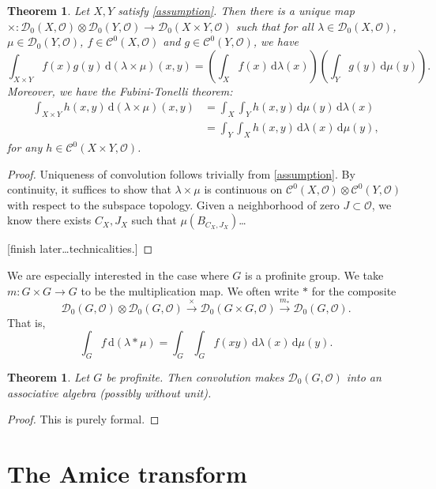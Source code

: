 \documentclass{article}
\newcommand{\cO}{\mathcal{O}}
\newcommand{\dd}{\mathrm{d}}
\newcommand{\sC}{\mathscr{C}}
\newcommand{\sD}{\mathscr{D}}
\newtheorem{theorem}[subsection]{Theorem}
\theoremstyle{definition}
\begin{document}
\begin{theorem}
Let $X,Y$ satisfy \eqref{assumption}. Then there is a unique map
$\times\colon \sD_0(X,\cO)\otimes \sD_0(Y,\cO)\to \sD_0(X\times Y,\cO)$ such 
that for all $\lambda\in \sD_0(X,\cO)$, $\mu\in \sD_0(Y,\cO)$, 
$f\in \sC^0(X,\cO)$ and $g\in \sC^0(Y,\cO)$, we have 
\[
  \int_{X\times Y} f(x) g(y)\, \dd(\lambda\times \mu)(x,y) = \left(\int_X f(x)\, \dd\lambda(x)\right) \left(\int_Y g(y)\, \dd \mu(y)\right) .
\]
Moreover, we have the \emph{Fubini-Tonelli theorem}: 
\begin{align*}
  \int_{X\times Y} h(x,y)\, \dd(\lambda\times \mu)(x,y)
    &= \int_X \int_Y h(x,y) \, \dd \mu(y) \, \dd \lambda(x) \\
    &= \int_Y \int_X h(x,y)\, \dd \lambda(x)\, \dd \mu(y) ,
\end{align*}
for any $h\in \sC^0(X\times Y,\cO)$. 
\end{theorem}
\begin{proof}
Uniqueness of convolution follows trivially from \eqref{assumption}. By 
continuity, it suffices to show that $\lambda\times\mu$ is continuous on 
$\sC^0(X,\cO)\otimes \sC^0(Y,\cO)$ with respect to the subspace topology. 
Given a neighborhood of zero $J\subset \cO$, we know there exists 
$C_X,J_X$ such that $\mu(B_{C_X,J_X})$\ldots 

[finish later\ldots technicalities.]
\end{proof}

We are especially interested in the case where $G$ is a profinite group. We 
take $m:G\times G\to G$ to be the multiplication map. We often write $\ast$ 
for the composite 
\[
  \sD_0(G,\cO)\otimes \sD_0(G,\cO)\xrightarrow{\times} \sD_0(G\times G,\cO)\xrightarrow{m_\ast} \sD_0(G,\cO) .
\]
That is, 
\[
  \int_G f\, \dd(\lambda\ast \mu) = \int_G \int_G f(x y)\, \dd \lambda(x)\, \dd \mu(y) .
\]
\begin{theorem}
Let $G$ be profinite. Then convolution makes $\sD_0(G,\cO)$ into an 
associative algebra (possibly without unit). 
\end{theorem}
\begin{proof}
This is purely formal. 
\end{proof}





\section{The Amice transform}
\end{document}
